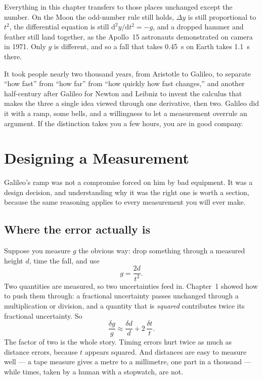 \documentclass[11pt,twoside,openany]{book}
\newcommand{\dd}{\mathrm{d}}
\begin{document}
Everything in this chapter transfers to those places unchanged except the number. On the Moon the odd-number rule still holds, $\Delta y$ is still proportional to $t^2$, the differential equation is still $\dd^2 y/\dd t^2 = -g$, and a dropped hammer and feather still land together, as the Apollo~15 astronauts demonstrated on camera in 1971. Only $g$ is different, and so a fall that takes \SI{0.45}{\second} on Earth takes \SI{1.1}{\second} there.

It took people nearly two thousand years, from Aristotle to Galileo, to separate ``how fast'' from ``how far'' from ``how quickly how fast changes,'' and another half-century after Galileo for Newton and Leibniz to invent the calculus that makes the three a single idea viewed through one derivative, then two. Galileo did it with a ramp, some bells, and a willingness to let a measurement overrule an argument. If the distinction takes you a few hours, you are in good company.

\section{Designing a Measurement}
\label{sec:designing}

Galileo's ramp was not a compromise forced on him by bad equipment. It was a design decision, and understanding why it was the right one is worth a section, because the same reasoning applies to every measurement you will ever make.

\subsection{Where the error actually is}

Suppose you measure $g$ the obvious way: drop something through a measured height $d$, time the fall, and use
\[
g = \frac{2d}{t^{2}} .
\]
Two quantities are measured, so two uncertainties feed in. Chapter~1 showed how to push them through: a fractional uncertainty passes unchanged through a multiplication or division, and a quantity that is \emph{squared} contributes twice its fractional uncertainty. So
\begin{equation}
\frac{\delta g}{g} \approx \frac{\delta d}{d} + 2\,\frac{\delta t}{t}.
\label{eq:gerror}
\end{equation}
The factor of two is the whole story. Timing errors hurt twice as much as distance errors, because $t$ appears squared. And distances are easy to measure well --- a tape measure gives a metre to a millimetre, one part in a thousand --- while times, taken by a human with a stopwatch, are not.
\end{document}
